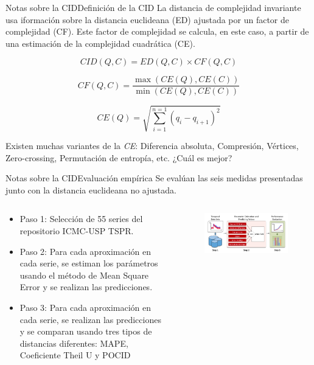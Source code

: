 \documentclass[12pt, aspectratio=169]{beamer} %
\begin{document}
\begin{frame}{Notas sobre la CID}{Definición de la CID}
  La distancia de complejidad invariante usa iformación sobre la distancia euclideana (ED) ajustada por un factor de complejidad (CF).
  Este factor de complejidad se calcula, en este caso, a partir de una estimación de la complejidad cuadrática (CE). 

  \[ CID(Q,C) = ED(Q,C) \times CF(Q,C) \]

  \[ CF(Q,C) = \frac
    { \max{ (CE(Q),CE(C))} }
    { \min{(CE(Q),CE(C))}  }
  \]

  \[ CE(Q) = \sqrt{ \sum_{i=1}^{n=1}{  ( q_i - q_{i+1} )^2 } }  \]

Existen muchas variantes de la \textit{CE}: Diferencia absoluta, Compresión, Vértices, Zero-crossing, Permutación de entropía, etc. ¿Cuál es mejor?


\end{frame}

\begin{frame}{Notas sobre la CID}{Evaluación empírica}
  Se evalúan las seis medidas presentadas junto con la distancia euclideana no ajustada.
  \begin{columns}
    \begin{column}{0.5\textwidth}
      \begin{itemize}
        \item Paso 1: Selección de 55 series del repositorio ICMC-USP TSPR.
        \item Paso 2: Para cada aproximación en cada serie, se estiman los parámetros usando el método de Mean Square Error y se realizan las predicciones.
        \item Paso 3: Para cada aproximación en cada serie, se realizan las predicciones y se comparan usando tres tipos de distancias diferentes: MAPE, Coeficiente Theil U y POCID
      \end{itemize}
    \end{column}

    \begin{column}{0.5\textwidth}
      \begin{figure}
        \includegraphics[width=\textwidth]{20210313_3_evaluacion_cid.png}
      \end{figure}
    \end{column}

    \end{columns}
  
\end{frame}
\end{document}
